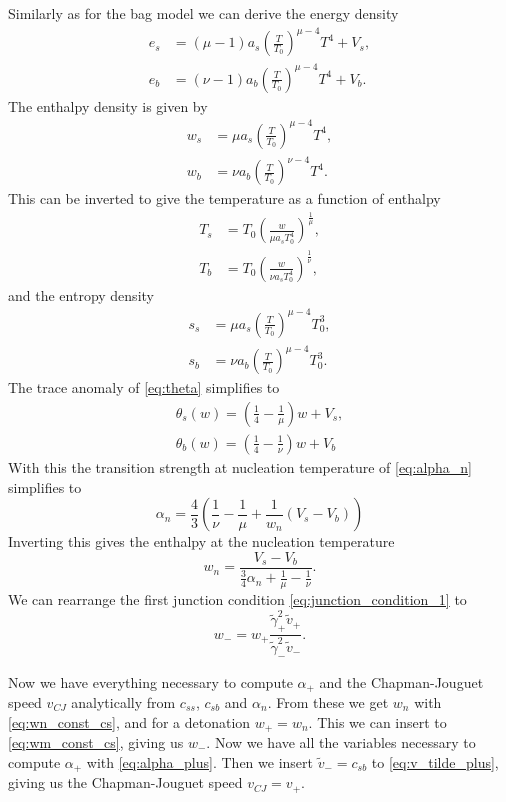 Similarly as for the bag model we can derive the energy density
\begin{align}
e_s &= (\mu - 1) a_s \left( \frac{T}{T_0} \right)^{\mu-4} T^4 + V_s, \\
e_b &= (\nu - 1) a_b \left( \frac{T}{T_0} \right)^{\mu-4} T^4 + V_b.
\end{align}
The enthalpy density is given by
\begin{align}
w_s &= \mu a_s \left( \frac{T}{T_0} \right)^{\mu-4} T^4, \\
w_b &= \nu a_b \left( \frac{T}{T_0} \right)^{\nu-4} T^4.
\end{align}
This can be inverted to give the temperature as a function of enthalpy
\begin{align}
T_s &= T_0 \left( \frac{w}{\mu a_s T_0^4} \right)^\frac{1}{\mu}, \\
T_b &= T_0 \left( \frac{w}{\nu a_s T_0^4} \right)^\frac{1}{\nu},
\end{align}
and the entropy density
\begin{align}
s_s &= \mu a_s \left( \frac{T}{T_0} \right)^{\mu-4} T_0^3, \\
s_b &= \nu a_b \left( \frac{T}{T_0} \right)^{\mu-4} T_0^3.
\end{align}
The trace anomaly of \eqref{eq:theta} simplifies to
\begin{align}
\theta_s(w) = \left( \frac{1}{4} - \frac{1}{\mu} \right) w + V_s, \\
\theta_b(w) = \left( \frac{1}{4} - \frac{1}{\nu} \right) w + V_b
\end{align}
With this the transition strength at nucleation temperature of \eqref{eq:alpha_n} simplifies to
\begin{equation}
\alpha_n = \frac{4}{3} \left( \frac{1}{\nu} - \frac{1}{\mu} + \frac{1}{w_n} (V_s - V_b) \right)
\end{equation}
Inverting this gives the enthalpy at the nucleation temperature
\begin{equation}
w_n = \frac{V_s - V_b}{ \frac{3}{4} \alpha_n + \frac{1}{\mu} - \frac{1}{\nu} }.
\label{eq:wn_const_cs}
\end{equation}
We can rearrange the first junction condition \eqref{eq:junction_condition_1} to
\begin{equation}
w_- = w_+ \frac{\tilde{\gamma}_+^2 \tilde{v}_+}{\tilde{\gamma}_-^2 \tilde{v}_-}.
\label{eq:wm_const_cs}
\end{equation}

Now we have everything necessary to compute $\alpha_+$ and the Chapman-Jouguet speed $v_{CJ}$ analytically from $c_{ss}$, $c_{sb}$ and $\alpha_n$.
From these we get $w_n$ with \eqref{eq:wn_const_cs}, and for a detonation $w_+=w_n$.
This we can insert to \eqref{eq:wm_const_cs}, giving us $w_-$.
Now we have all the variables necessary to compute $\alpha_+$ with \eqref{eq:alpha_plus}.
Then we insert $\tilde{v}_- = c_{sb}$ to \eqref{eq:v_tilde_plus}, giving us the Chapman-Jouguet speed $v_{CJ} = v_+$.


